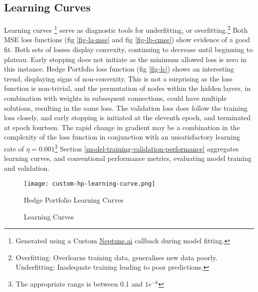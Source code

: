 \documentclass[12pt]{article}
\begin{document}
\subsection{Learning Curves}
Learning curves
\footnote{Generated using a Custom \href{https://neptune.ai/}{Neptune.ai} callback during model fitting.}
serve as diagnostic tools for underfitting, or overfitting.\footnote{Overfitting: Overlearns training data, generalises new data poorly. Underfitting: Inadequate training leading to poor predictions.}
Both MSE loss functions (fig \ref{fig-la-mse} and fig \ref{fig-lb-cmse}) show evidence of a good fit.
Both sets of losses display convexity, continuing to decrease until beginning to plateau.
Early stopping does not initiate as the minimum allowed loss is zero in this instance.
Hedge Portfolio loss function (fig \ref{fig-lc}) shows an interesting trend, displaying signs of non-convexity.
This is not a surprising as the loss function is non-trivial, and the permutation of nodes within the hidden layers,
in combination with weights in subsequent connections, could have multiple solutions, resulting in the same loss.
The validation loss does follow the training loss closely, and early stopping is initiated at the eleventh epoch, and terminated at epoch fourteen.
The rapid change in gradient may be a combination in the complexity of the loss function in conjunction with an unsatisfactory learning rate of $\eta = 0.001$\footnote{The appropriate range is between 0.1 and $1e^{-6}$}
Section \ref{model-training-validation-performance} aggregates learning curves, and conventional performance metrics, evaluating model training and validation.

\begin{figure}[H]
	\centering
	\texttt{[image: custom-hp-learning-curve.png]}
	\caption{Hedge Portfolio Learning Curves}
	\label{fig:hp-lc}
\end{figure}
\begin{figure}[H]
	\centering
	\vfill
	\caption{Learning Curves}
	\label{fig:mse-learning-curves}
\end{figure}
\end{document}
